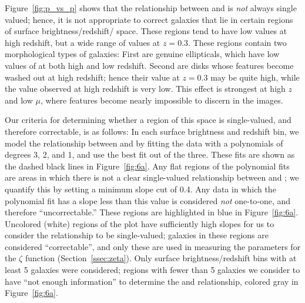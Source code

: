 \documentclass[twocolumn]{aastex6}
\begin{document}
Figure~\ref{fig:p_vs_p} shows that the relationship between \pfeaturesz{} and \pfeaturesrest{} is \emph{not} always single valued; hence, it is not appropriate to correct galaxies that lie in certain regions of surface brightness/redshift/\pfeatures{} space. These regions tend to have low \pfeatures{} values at high redshift, but a wide range of values at $z=0.3$. These regions contain two morphological types of galaxies: First are genuine ellipticals, which have low values of \pfeatures{} at both high and low redshift. Second are disks whose features become washed out at high redshift; hence their \pfeatures{} value at $z=0.3$ may be quite high, while the value observed at high redshift is very low. This effect is strongest at high $z$ and low $\mu$, where features become nearly impossible to discern in the images.

Our criteria for determining whether a region of this space is single-valued, and therefore correctable, is as follows: In each surface brightness and redshift bin, we model the relationship between \pfeaturesz{} and \pfeaturesrest{} by fitting the data with a polynomials of degrees 3, 2, and 1, and use the best fit out of the three. These fits are shown as the dashed black lines in Figure~\ref{fig:6a}. Any flat regions of the polynomial fits are areas in which there is not a clear single-valued relationship between \pfeaturesz{} and \pfeaturesrest; we quantify this by setting a minimum slope cut of 0.4. Any data in which the polynomial fit has a slope less than this value is considered \emph{not} one-to-one, and therefore ``uncorrectable.'' These regions are highlighted in blue in Figure~\ref{fig:6a}. Uncolored (white) regions of the plot have sufficiently high slopes for us to consider the relationship to be single-valued; galaxies in these regions are considered ``correctable'', and only these are used in measuring the parameters for the $\zeta$ function (Section~\ref{ssec:zeta}). Only surface brightness/redshift bins with at least 5 galaxies were considered; regions with fewer than 5 galaxies we consider to have ``not enough information'' to determine the \pfeaturesz{} and \pfeaturesrest{} relationship, colored gray in Figure~\ref{fig:6a}.
\end{document}
